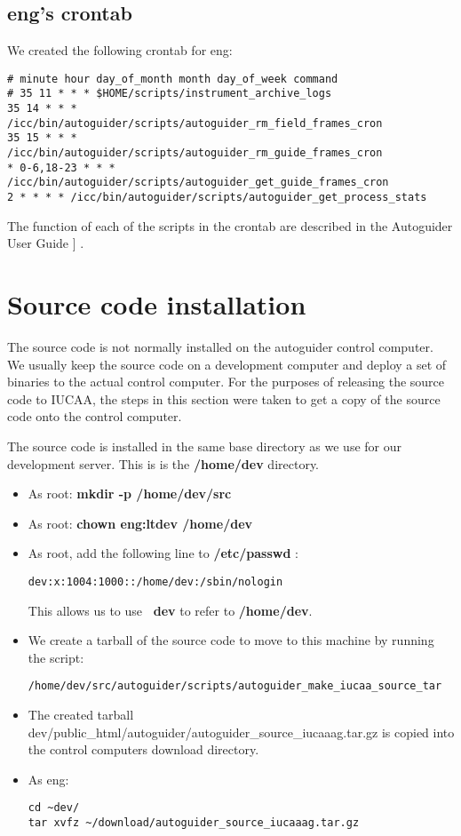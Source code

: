 \documentclass[10pt,a4paper]{article}
\begin{document}
\subsection{eng's crontab}

We created the following crontab for eng:
\begin{verbatim}
# minute hour day_of_month month day_of_week command
# 35 11 * * * $HOME/scripts/instrument_archive_logs
35 14 * * * /icc/bin/autoguider/scripts/autoguider_rm_field_frames_cron
35 15 * * * /icc/bin/autoguider/scripts/autoguider_rm_guide_frames_cron
* 0-6,18-23 * * * /icc/bin/autoguider/scripts/autoguider_get_guide_frames_cron
2 * * * * /icc/bin/autoguider/scripts/autoguider_get_process_stats
\end{verbatim}

The function of each of the scripts in the crontab are described in the Autoguider User Guide ]
\cite{bib:autoguideruserguide}.

\section{Source code installation}

The source code is not normally installed on the autoguider control computer. We usually keep the source code on a development computer and deploy a set of binaries to the actual control computer. For the purposes of releasing the source code to IUCAA, the steps in this section were taken to get a copy of the source code onto the control computer.

The source code is installed in the same base directory as we use for our development server. This is is the {\bf /home/dev} directory.

\begin{itemize}
\item As root: {\bf mkdir -p /home/dev/src}
\item As root: {\bf chown eng:ltdev /home/dev}
\item As root, add the following line to {\bf /etc/passwd} : 
\begin{verbatim}
dev:x:1004:1000::/home/dev:/sbin/nologin
\end{verbatim}
This allows us to use {\bf ~dev} to refer to {\bf /home/dev}.
\item We create a tarball of the source code to move to this machine by running the script:
\begin{verbatim}
/home/dev/src/autoguider/scripts/autoguider_make_iucaa_source_tar
\end{verbatim}
\item The created tarball \mytilde dev/public\_html/autoguider/autoguider\_source\_iucaaag.tar.gz is copied into the control computers download directory.
\item As eng:
\begin{verbatim}
cd ~dev/
tar xvfz ~/download/autoguider_source_iucaaag.tar.gz
\end{verbatim}
\end{itemize}
\end{document}
